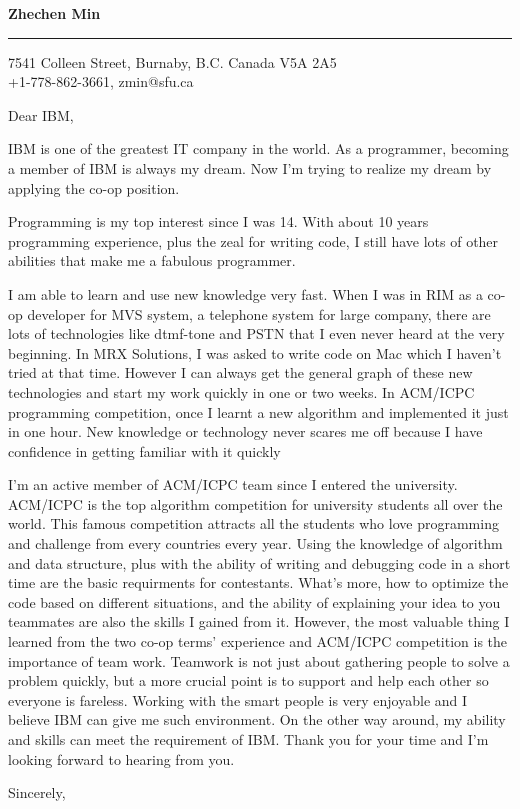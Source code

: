 \documentclass{letter} %
\begin{document}
\signature{Zhechen Min}           %
\longindentation=0pt                       %
\let\raggedleft\raggedright                %
 
 
\begin{letter}{}


\begin{flushleft}
{\large\bf Zhechen Min}
\end{flushleft}
\medskip\hrule height 1pt
\begin{flushright}
\hfill 7541 Colleen Street, Burnaby, B.C. Canada V5A 2A5 \\
\hfill +1-778-862-3661, zmin@sfu.ca
\end{flushright} 
\vfill %

 
\opening{Dear IBM,} 
 
\noindent IBM is one of the greatest IT company in the world. As a programmer, becoming a member of IBM is always my dream. Now I'm trying to realize my dream by applying the co-op position.

\noindent Programming is my top interest since I was 14. With about 10 years programming experience, plus the zeal for writing code, I still have lots of other abilities that make me a fabulous programmer. 

\noindent I am able to learn and use new knowledge very fast. When I was in RIM as a co-op developer for MVS system, a telephone system for large company, there are lots of technologies like dtmf-tone and PSTN that I even never heard at the very beginning. In MRX Solutions, I was asked to write code on Mac which I haven't tried at that time. However I can always get the general graph of these new technologies and start my work quickly in one or two weeks. In ACM/ICPC programming competition, once I learnt a new algorithm and implemented it just in one hour. New knowledge or technology never scares me off because I have confidence in getting familiar with it quickly

\noindent I'm an active member of ACM/ICPC team since I entered the university. ACM/ICPC is the top algorithm competition for university students all over the world. This famous competition attracts all the students who love programming and challenge from every countries every year. Using the knowledge of algorithm and data structure, plus with the ability of writing and debugging code in a short time are the basic requirments for contestants. What's more, how to optimize the code based on different situations, and the ability of explaining your idea to you teammates are also the skills I gained from it. 
\noindent However, the most valuable thing I learned from the two co-op terms' experience and ACM/ICPC competition is the importance of team work. Teamwork is not just about gathering people to solve a problem quickly, but a more crucial point is to support and help each other so everyone is fareless. Working with the smart people is very enjoyable and I believe IBM can give me such environment. On the other way around, my ability and skills can meet the requirement of IBM. Thank you for your time and I'm looking forward to hearing from you. 

\closing{Sincerely,} 
 


\end{letter}
 
\end{document}
